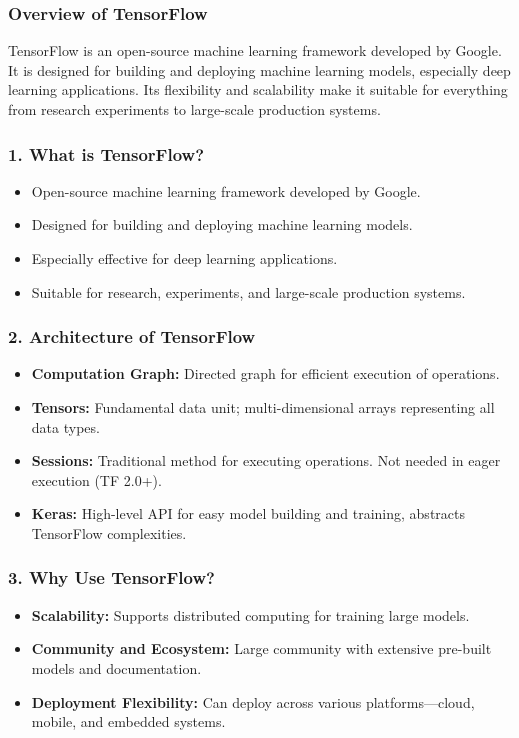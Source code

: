 \documentclass[aspectratio=169]{beamer}
\begin{document}
\begin{frame}
    \frametitle{Overview of TensorFlow}
    TensorFlow is an open-source machine learning framework developed by Google. 
    It is designed for building and deploying machine learning models, especially deep learning applications.
    Its flexibility and scalability make it suitable for everything from research experiments to large-scale production systems.
\end{frame}

\begin{frame}
    \frametitle{1. What is TensorFlow?}
    \begin{itemize}
        \item Open-source machine learning framework developed by Google.
        \item Designed for building and deploying machine learning models.
        \item Especially effective for deep learning applications.
        \item Suitable for research, experiments, and large-scale production systems.
    \end{itemize}
\end{frame}

\begin{frame}
    \frametitle{2. Architecture of TensorFlow}
    \begin{itemize}
        \item \textbf{Computation Graph:} Directed graph for efficient execution of operations.
        \item \textbf{Tensors:} Fundamental data unit; multi-dimensional arrays representing all data types.
        \item \textbf{Sessions:} Traditional method for executing operations. Not needed in eager execution (TF 2.0+).
        \item \textbf{Keras:} High-level API for easy model building and training, abstracts TensorFlow complexities.
    \end{itemize}
\end{frame}

\begin{frame}
    \frametitle{3. Why Use TensorFlow?}
    \begin{itemize}
        \item \textbf{Scalability:} Supports distributed computing for training large models.
        \item \textbf{Community and Ecosystem:} Large community with extensive pre-built models and documentation.
        \item \textbf{Deployment Flexibility:} Can deploy across various platforms—cloud, mobile, and embedded systems.
    \end{itemize}
\end{frame}
\end{document}

